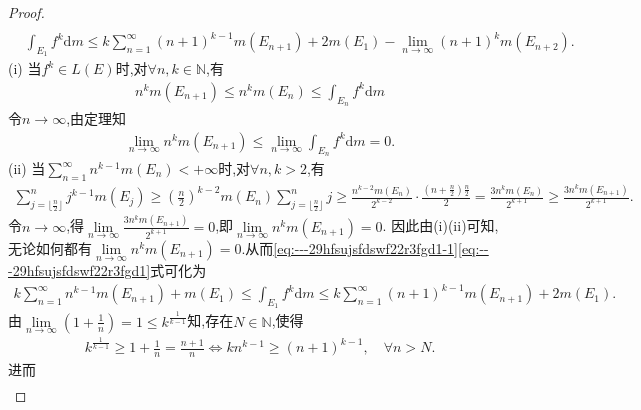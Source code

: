 \documentclass[../../main.tex]{subfiles}%
\begin{document}
\begin{proof}
\begin{align}
\\
&\int_{E_1}{f^k\mathrm{d}m}\leqslant k\sum_{n=1}^{\infty}{\left( n+1 \right) ^{k-1}m\left( E_{n+1} \right)}+2m\left( E_1 \right) -\underset{n\rightarrow \infty}{\lim}\left( n+1 \right) ^km\left( E_{n+2} \right) .\label{eq:---29hfsujsfdswf22r3fgd1}
\end{align}
(i) 当$f^k\in L\left( E \right)$时,对$\forall n,k\in \mathbb{N}$,有
\begin{align*}
n^km\left( E_{n+1} \right) \leqslant n^km\left( E_n \right) \leqslant \int_{E_n}{f^k\mathrm{d}m}
\end{align*}
令$n\rightarrow \infty$,由定理知
\begin{align*}
\underset{n\rightarrow \infty}{\lim} n^km\left( E_{n+1} \right) \leqslant \underset{n\rightarrow \infty}{\lim} \int_{E_n}{f^k\mathrm{d}m}=0.
\end{align*}
(ii) 当$\sum_{n=1}^{\infty}{n^{k-1}m\left( E_n \right)}<+\infty$时,对$\forall n,k>2$,有
\begin{align*}
\sum_{j=\lfloor \frac{n}{2} \rfloor}^n{j^{k-1}m\left( E_j \right)}\geqslant \left( \frac{n}{2} \right) ^{k-2}m\left( E_n \right) \sum_{j=\lfloor \frac{n}{2} \rfloor}^n{j}\geqslant \frac{n^{k-2}m\left( E_n \right)}{2^{k-2}}\cdot \frac{\left( n+\frac{n}{2} \right) \frac{n}{2}}{2}=\frac{3n^km\left( E_n \right)}{2^{k+1}}\geqslant \frac{3n^km\left( E_{n+1} \right)}{2^{k+1}}.
\end{align*}
令$n\rightarrow \infty$,得$\underset{n\rightarrow \infty}{\lim} \frac{3n^km\left( E_{n+1} \right)}{2^{k+1}}=0$,即$\underset{n\rightarrow \infty}{\lim} n^km\left( E_{n+1} \right) =0$.
因此由(i)(ii)可知,无论如何都有$\underset{n\rightarrow \infty}{\lim} n^km\left( E_{n+1} \right) =0$.从而\eqref{eq:---29hfsujsfdswf22r3fgd1-1}\eqref{eq:---29hfsujsfdswf22r3fgd1}式可化为
\begin{align}
k\sum_{n=1}^{\infty}{n^{k-1}m\left( E_{n+1} \right)}+m\left( E_1 \right) \leqslant \int_{E_1}{f^k\mathrm{d}m}\leqslant k\sum_{n=1}^{\infty}{\left( n+1 \right) ^{k-1}m\left( E_{n+1} \right)}+2m\left( E_1 \right).\label{eq:---29hfsujsfdswf22r3fgd2}
\end{align}
由$\underset{n\rightarrow \infty}{\lim} \left( 1+\frac{1}{n} \right) =1\leqslant k^{\frac{1}{k-1}}$知,存在$N\in \mathbb{N}$,使得
\begin{align*}
k^{\frac{1}{k-1}}\geqslant 1+\frac{1}{n}=\frac{n+1}{n}\Longleftrightarrow kn^{k-1}\geqslant \left( n+1 \right) ^{k-1},\quad \forall n>N.
\end{align*}
进而
\begin{align*}

\end{align*}
\end{proof}
\end{document}
